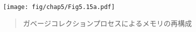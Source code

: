 \begin{figure}[tp]
\label{Figure 5.15}
\centering
\begin{comment}
\begin{quote}
\heading{Figure 5.15:} Reconfiguration of memory by the garbage-collection process.

\begin{example}
             Just before garbage collection

         +------------------------------------+
the-cars |                                    | working
         | mixture of useful data and garbage | memory
the-cdrs |                                    |
         +------------------------------------+
                                            ^
                                            | free

         +------------------------------------+
new-cars |                                    | free   
         |            free memory             | memory
new-cdrs |                                    |
         +------------------------------------+

             Just after garbage collection

         +------------------------------------+
new-cars |                                    | new  
         |          discarded memory          | free  
new-cdrs |                                    | memory
         +------------------------------------+

         +------------------+-----------------+
the-cars |                  |                 | new
         |   useful data    |    free area    | working
the-cdrs |                  |                 | memory
         +------------------+-----------------+
                              ^
                              | free
\end{example}
\end{quote}
\end{comment}
\texttt{[image: fig/chap5/Fig5.15a.pdf]}
\begin{quote}
 ガベージコレクションプロセスによるメモリの再構成
\end{quote}
\end{figure}

